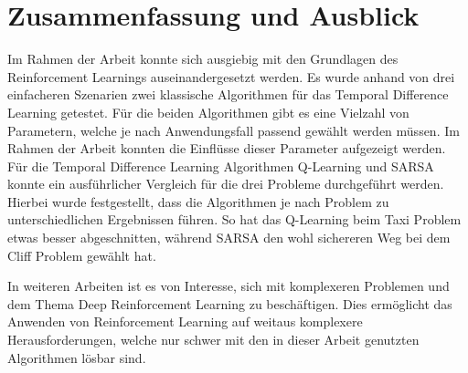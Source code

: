 \section{Zusammenfassung und Ausblick}

Im Rahmen der Arbeit konnte sich ausgiebig mit den Grundlagen des Reinforcement Learnings auseinandergesetzt werden. Es wurde anhand von drei einfacheren Szenarien zwei klassische Algorithmen für das Temporal Difference Learning getestet.
Für die beiden Algorithmen gibt es eine Vielzahl von Parametern, welche je nach Anwendungsfall passend gewählt werden müssen. Im Rahmen der Arbeit konnten die Einflüsse dieser Parameter aufgezeigt werden. Für die Temporal Difference Learning Algorithmen Q-Learning und SARSA konnte ein ausführlicher Vergleich für die drei Probleme durchgeführt werden.
Hierbei wurde festgestellt, dass die Algorithmen je nach Problem zu unterschiedlichen Ergebnissen führen. So hat das Q-Learning beim Taxi Problem etwas besser abgeschnitten, während SARSA den wohl sichereren Weg bei dem Cliff Problem gewählt hat. 

In weiteren  Arbeiten ist es von Interesse, sich mit komplexeren Problemen und dem Thema Deep Reinforcement Learning zu beschäftigen. Dies ermöglicht das Anwenden von Reinforcement Learning auf weitaus komplexere Herausforderungen, welche nur schwer mit den in dieser Arbeit genutzten Algorithmen lösbar sind.